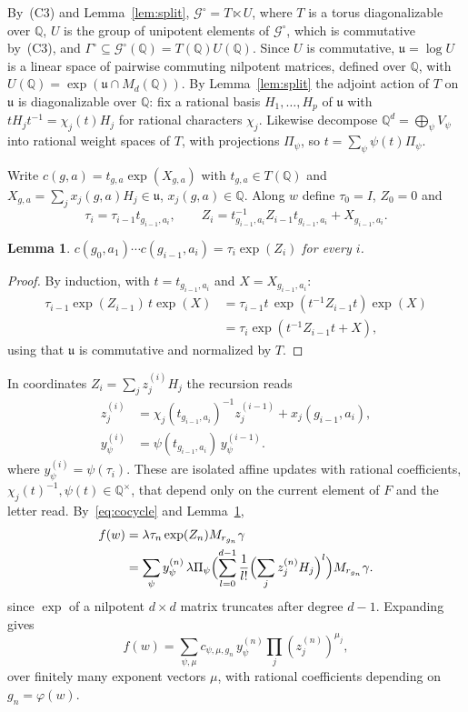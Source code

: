 \documentclass[11pt,letterpaper]{article}
\newcommand{\Q}{\mathbb{Q}}
\newcommand{\cG}{\mathcal{G}}
\newcommand{\fu}{\mathfrak{u}}
\newtheorem{lemma}[theorem]{Lemma}
\theoremstyle{definition}
\begin{document}
By~(C3) and Lemma~\ref{lem:split}, $\cG^\circ=T\ltimes U$, where $T$ is a torus diagonalizable over $\Q$, $U$ is the group of unipotent elements of $\cG^\circ$, which is commutative by~(C3), and $\Gamma^\circ\subseteq\cG^\circ(\Q)=T(\Q)U(\Q)$. Since $U$ is commutative, $\fu=\log U$ is a linear space of pairwise commuting nilpotent matrices, defined over $\Q$, with $U(\Q)=\exp(\fu\cap M_d(\Q))$. By Lemma~\ref{lem:split} the adjoint action of $T$ on $\fu$ is diagonalizable over $\Q$: fix a rational basis $H_1,\ldots,H_p$ of $\fu$ with $tH_jt^{-1}=\chi_j(t)H_j$ for rational characters $\chi_j$. Likewise decompose $\Q^d=\bigoplus_\psi V_\psi$ into rational weight spaces of $T$, with projections $\Pi_\psi$, so $t=\sum_\psi\psi(t)\Pi_\psi$.

Write $c(g,a)=t_{g,a}\exp(X_{g,a})$ with $t_{g,a}\in T(\Q)$ and $X_{g,a}=\sum_jx_j(g,a)H_j\in\fu$, $x_j(g,a)\in\Q$. Along $w$ define $\tau_0=I$, $Z_0=0$ and
\[
\tau_i=\tau_{i-1}t_{g_{i-1},a_i},\qquad Z_i=t_{g_{i-1},a_i}^{-1}Z_{i-1}t_{g_{i-1},a_i}+X_{g_{i-1},a_i}.
\]
\begin{lemma}\label{lem:product}
$c(g_0,a_1)\cdots c(g_{i-1},a_i)=\tau_i\exp(Z_i)$ for every $i$.
\end{lemma}
\begin{proof}
By induction, with $t=t_{g_{i-1},a_i}$ and $X=X_{g_{i-1},a_i}$:
\[
\begin{aligned}
\tau_{i-1}\exp(Z_{i-1})\,t\exp(X)
 &=\tau_{i-1}t\,\exp(t^{-1}Z_{i-1}t)\exp(X)\\
 &=\tau_i\exp(t^{-1}Z_{i-1}t+X),
\end{aligned}
\]
using that $\fu$ is commutative and normalized by $T$.
\end{proof}

In coordinates $Z_i=\sum_jz_j^{(i)}H_j$ the recursion reads
\begin{equation}\label{eq:isolated}
\begin{aligned}
z_j^{(i)}&=\chi_j(t_{g_{i-1},a_i})^{-1}z_j^{(i-1)}+x_j(g_{i-1},a_i),\\
y_\psi^{(i)}&=\psi(t_{g_{i-1},a_i})\,y_\psi^{(i-1)}.
\end{aligned}
\end{equation}
where $y_\psi^{(i)}=\psi(\tau_i)$. These are isolated affine updates with rational coefficients, $\chi_j(t)^{-1},\psi(t)\in\Q^\times$, that depend only on the current element of $F$ and the letter read. By~\eqref{eq:cocycle} and Lemma~\ref{lem:product},
\begin{equation}\label{eq:output}
\begin{aligned}
f(w)&=\lambda \tau_n\exp(Z_n)M_{r_{g_n}}\gamma\\
&=\sum_\psi y^{(n)}_\psi\,\lambda\Pi_\psi
 \Bigl(\sum_{l=0}^{d-1}\frac1{l!}\Bigl(\sum_jz^{(n)}_jH_j\Bigr)^l\Bigr)M_{r_{g_n}}\gamma.
\end{aligned}
\end{equation}
since $\exp$ of a nilpotent $d\times d$ matrix truncates after degree $d-1$. Expanding gives
\[f(w)=\sum_{\psi,\mu}c_{\psi,\mu,g_n}\,y_\psi^{(n)}\prod_j(z_j^{(n)})^{\mu_j},\]
over finitely many exponent vectors $\mu$, with rational coefficients depending on $g_n=\varphi(w)$.
\end{document}
